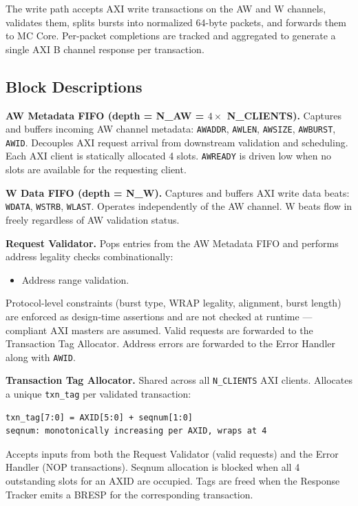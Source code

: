 The write path accepts AXI write transactions on the AW and W channels, validates them, splits bursts into normalized 64-byte packets, and forwards them to MC Core. Per-packet completions are tracked and aggregated to generate a single AXI B channel response per transaction.

\subsection{Block Descriptions}

\textbf{AW Metadata FIFO (depth = N\_AW = $4 \times$ N\_CLIENTS).}
Captures and buffers incoming AW channel metadata: \texttt{AWADDR}, \texttt{AWLEN}, \texttt{AWSIZE}, \texttt{AWBURST}, \texttt{AWID}. Decouples AXI request arrival from downstream validation and scheduling. Each AXI client is statically allocated 4 slots. \texttt{AWREADY} is driven low when no slots are available for the requesting client.

\textbf{W Data FIFO (depth = N\_W).}
Captures and buffers AXI write data beats: \texttt{WDATA}, \texttt{WSTRB}, \texttt{WLAST}. Operates independently of the AW channel. W beats flow in freely regardless of AW validation status.

\textbf{Request Validator.}
Pops entries from the AW Metadata FIFO and performs address legality checks combinationally:
\begin{itemize}[noitemsep]
    \item Address range validation.
\end{itemize}
Protocol-level constraints (burst type, WRAP legality, alignment, burst length) are enforced as design-time assertions and are not checked at runtime — compliant AXI masters are assumed. Valid requests are forwarded to the Transaction Tag Allocator. Address errors are forwarded to the Error Handler along with \texttt{AWID}.

\textbf{Transaction Tag Allocator.}
Shared across all \texttt{N\_CLIENTS} AXI clients. Allocates a unique \texttt{txn\_tag} per validated transaction:
\begin{lstlisting}
txn_tag[7:0] = AXID[5:0] + seqnum[1:0]
seqnum: monotonically increasing per AXID, wraps at 4
\end{lstlisting}
Accepts inputs from both the Request Validator (valid requests) and the Error Handler (NOP transactions). Seqnum allocation is blocked when all 4 outstanding slots for an AXID are occupied. Tags are freed when the Response Tracker emits a BRESP for the corresponding transaction.

